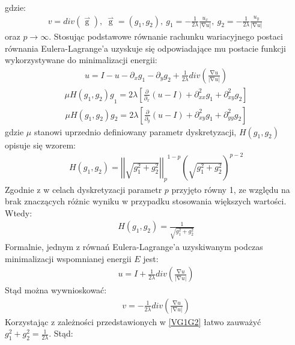 \documentclass[12pt, twoside, openany]{report}
\theoremstyle{definition}
\begin{document}
gdzie:
\begin{align}
v=div\left(\mathop{g}\limits^{\rightharpoonup}\right),\ \mathop{g}\limits^{\rightharpoonup}=\left(g_1,g_2\right),\ g_1=-\frac{1}{2\lambda }\frac{u_x}{\left|\mathrm{\nabla }u\right|},\ g_2=-\frac{1}{2\lambda }\frac{u_y}{\left|\mathrm{\nabla }u\right|}\
\label{VG1G2}
\end{align}
oraz $p\to \mathrm{\infty }$. Stosując podstawowe równanie rachunku wariacyjnego postaci równania Eulera-Lagrange'a uzyskuje się odpowiadające mu postacie funkcji wykorzystywane do minimalizacji energii:
\begin{align}
u=I-u-{\partial }_xg_1-{\partial }_yg_2+\frac{1}{2\lambda }div\left(\frac{\mathrm{\nabla }u}{\left|\mathrm{\nabla }u\right|}\right)
\end{align}
\begin{align}
{\mu H\left(g_1,g_2\right)g}_1=2\lambda \left[\frac{\partial }{{\partial }_x}\left(u-I\right)+{\partial }^2_{xx}g_1+{\partial }^2_{xy}g_2\right]
\end{align}
\begin{align}
\mu H\left(g_1,g_2\right)g_2=2\lambda \left[\frac{\partial }{{\partial }_y}\left(u-I\right)+{\partial }^2_{xy}g_1+{\partial }^2_{yy}g_2\right]
\end{align}
gdzie $\mu$ stanowi uprzednio definiowany parametr dyskretyzacji, $H\left(g_1,g_2\right)$ opisuje się wzorem:
\begin{align}
H\left(g_1,g_2\right)={{{\left|\left|\sqrt{g^2_1+g^2_2}\right|\right|}_p}^{1-p}}{\left(\sqrt{g^2_1+g^2_2}\right)}^{p-2}
\end{align}
Zgodnie z \cite{vese2003modeling} w celach dyskretyzacji parametr $p$ przyjęto równy 1, ze względu na brak znaczących różnic wyniku w przypadku stosowania większych wartości. Wtedy:
\begin{align}
H\left(g_1,g_2\right)=\frac{1}{\sqrt{g^2_1+g^2_2}}
\end{align}
Formalnie, jednym z równań Eulera-Lagrange'a uzyskiwanym podczas minimalizacji wspomnianej energii $E$ jest:
\begin{align}
u=I+\frac{1}{2\lambda }div\left(\frac{\mathrm{\nabla }u}{\left|\mathrm{\nabla }u\right|}\right)
\end{align}
Stąd można wywnioskować:
\begin{align}
v=-\frac{1}{2\lambda }div\left(\frac{\mathrm{\nabla }u}{\left|\mathrm{\nabla }u\right|}\right)
\end{align}
Korzystając z zależności przedstawionych w \eqref{VG1G2} łatwo zauważyć $g^2_1+g^2_2=\frac{1}{2\lambda }$. Stąd:
\end{document}

